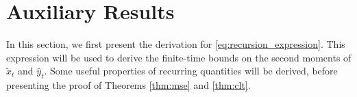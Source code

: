 \section{Auxiliary Results}
In this section, we first present the derivation for \eqref{eq:recursion_expression}.
This expression will be used to derive the finite-time bounds on the second moments of $\tilde{x}_t$ and $\hat{y}_t$. 
Some useful properties of recurring quantities will be derived, before presenting the proof of Theorems \ref{thm:mse} and \ref{thm:clt}.






